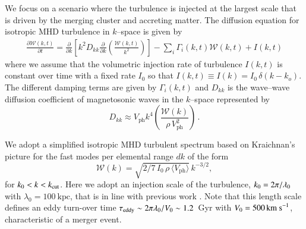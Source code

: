 \documentclass[fleqn,usenatbib,useAMS]{mnras}
\newcommand{\Vph}{V_\mathrm{ph}}
\begin{document}
We focus on a scenario where the turbulence is injected at the largest
scale that is driven by the merging cluster and accreting matter. The
diffusion equation for isotropic MHD turbulence in $k$--space is given
by
\begin{equation}
  \begin{aligned}
\frac{\partial {\mathcal W}(k,t)}{\partial t}
=
\frac{\partial}{\partial k}
\left[
k^2 D_{kk}
\frac{\partial}{\partial k}
\left( \frac{{\mathcal W}(k,t)}{k^2} \right)
\right]
- \sum_i \Gamma_i (k,t) {\mathcal W}(k,t)
+ I(k,t)
\end{aligned}
\label{modes_kinetic}
\end{equation}
where we assume that the volumetric injection rate of turbulence
$I(k,t)$ is constant over time with a fixed rate $I_0$ so that $I(k,t)
\equiv I(k) = I_0\,\delta (k - k_o)$. The different damping terms are
given by $\Gamma_i(k,t)$ and $D_{kk}$ is the wave--wave diffusion
coefficient of magnetosonic waves in the $k$--space represented by
\begin{equation}
  \label{eq:Dkk}
  D_{kk} \approx \Vph k^4
  \left(\frac{\mathcal{W}(k)}{\rho\,\Vph^2}\right)\,.
\end{equation}

We adopt a simplified isotropic MHD turbulent spectrum based on
Kraichnan's picture for the fast modes per elemental range $dk$ of the
form
\begin{equation}
  \label{eq:Wk}
  \mathcal{W}(k) =
\sqrt{2/7\,I_0\,\rho\,\langle \Vph \rangle}\,k^{-3/2},
\end{equation}
for $k_0<k<k_{\mathrm{cut}}$. Here we adopt an injection scale of the
turbulence, $k_0= 2\pi/\lambda_0$ with $\lambda_0 =100~\mbox{kpc}$,
that is in line with previous work \citep{brunetti07,brunetti11}. Note
that this length scale defines an eddy turn-over time
$\tau_{{\mathrm{eddy}}}\sim2\pi\lambda_0/V_0\sim1.2$~Gyr with
$V_0=500\,{\mathrm{km~s}}^{-1}$, characteristic of a merger event. 
\end{document}
